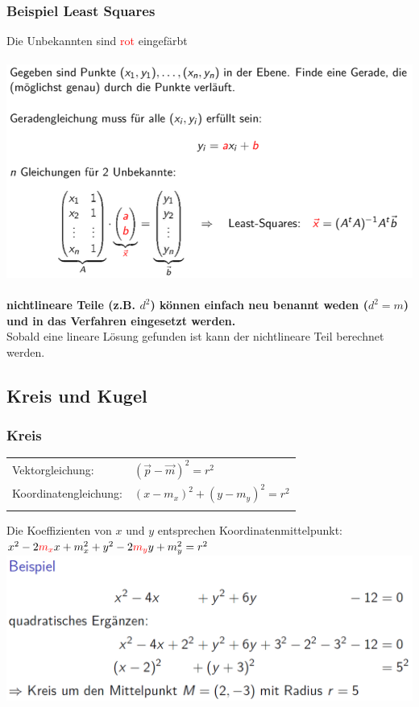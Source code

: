 			\subsubsection{Beispiel Least Squares}
			Die Unbekannten sind \textcolor{red}{rot} eingefärbt \\
			\\
			\includegraphics[width=0.8\linewidth]{Bilder/least-squares}\\
			\\
			\textbf{nichtlineare Teile (z.B. $d^2$) können einfach neu benannt weden ($d^2 = m$) und in das Verfahren eingesetzt werden.} \\
			Sobald eine lineare Lösung gefunden ist kann der nichtlineare Teil berechnet werden.
			
			
			\subsection{Kreis und Kugel}		
			
			\subsubsection{Kreis}
			\begin{tabular}{ll}
			Vektorgleichung: & $(\vec{p} - \vec{m})^2 = r^2$\\
			Koordinatengleichung: & $(x- m_x)^2 + (y-m_y)^2 = r^2$\\
			\\
			\end{tabular}
			
			Die Koeffizienten von $x$ und $y$ entsprechen Koordinatenmittelpunkt: \\
			$x^2 - 2 \textcolor{red}{m_x} x + m_x^2 + y^2 - 2 \textcolor{red}{m_y} y + m_y^2 = r^2 $		\\
			\includegraphics[width=0.8\linewidth]{Bilder/kreisgleichung}	\\
			

